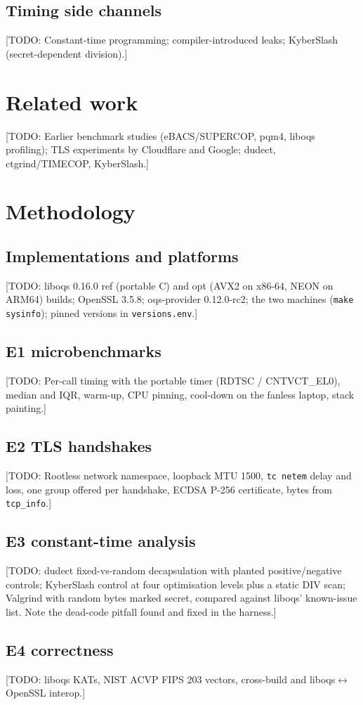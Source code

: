 \documentclass[11pt,a4paper]{article}
\newcommand{\todo}[1]{\textcolor{red!70!black}{[TODO: #1]}}
\begin{document}
\subsection{Timing side channels}
\todo{Constant-time programming; compiler-introduced leaks; KyberSlash (secret-dependent division).}

\section{Related work}\label{sec:related}
\todo{Earlier benchmark studies (eBACS/SUPERCOP, pqm4, liboqs profiling); TLS experiments by Cloudflare and
Google; dudect, ctgrind/TIMECOP, KyberSlash.}

\section{Methodology}\label{sec:method}
\subsection{Implementations and platforms}
\todo{liboqs 0.16.0 ref (portable C) and opt (AVX2 on x86-64, NEON on ARM64) builds; OpenSSL 3.5.8;
oqs-provider 0.12.0-rc2; the two machines (\texttt{make sysinfo}); pinned versions in \texttt{versions.env}.}
\subsection{E1 microbenchmarks}
\todo{Per-call timing with the portable timer (RDTSC / CNTVCT\_EL0), median and IQR, warm-up, CPU pinning,
cool-down on the fanless laptop, stack painting.}
\subsection{E2 TLS handshakes}
\todo{Rootless network namespace, loopback MTU 1500, \texttt{tc netem} delay and loss, one group offered per
handshake, ECDSA P-256 certificate, bytes from \texttt{tcp\_info}.}
\subsection{E3 constant-time analysis}
\todo{dudect fixed-vs-random decapsulation with planted positive/negative controls; KyberSlash control at four
optimisation levels plus a static DIV scan; Valgrind with random bytes marked secret, compared against liboqs'
known-issue list. Note the dead-code pitfall found and fixed in the harness.}
\subsection{E4 correctness}
\todo{liboqs KATs, NIST ACVP FIPS 203 vectors, cross-build and liboqs$\leftrightarrow$OpenSSL interop.}
\end{document}
